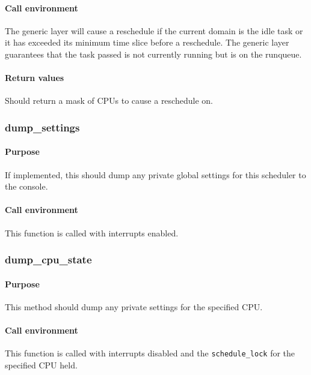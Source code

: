 \documentclass[11pt,twoside,final,openright]{xenstyle}
\begin{document}
\paragraph*{Call environment}
The generic layer will cause a reschedule if the current domain is the idle
task or it has exceeded its minimum time slice before a reschedule.  The
generic layer guarantees that the task passed is not currently running but is
on the runqueue.

\paragraph*{Return values}

Should return a mask of CPUs to cause a reschedule on.

\subsubsection{dump\_settings}

\paragraph*{Purpose}

If implemented, this should dump any private global settings for this
scheduler to the console.

\paragraph*{Call environment}

This function is called with interrupts enabled.

\subsubsection{dump\_cpu\_state}

\paragraph*{Purpose}

This method should dump any private settings for the specified CPU.

\paragraph*{Call environment}

This function is called with interrupts disabled and the {\tt schedule\_lock}
for the specified CPU held.
\end{document}
